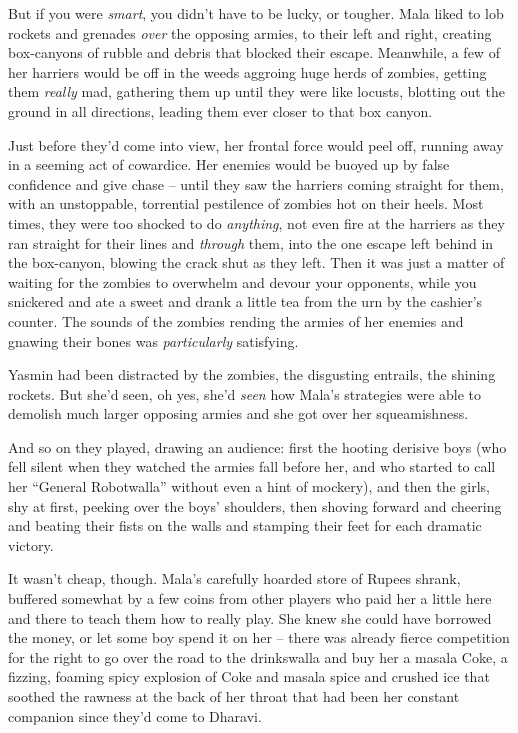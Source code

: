 But if you were \emph{smart}, you didn't have to be lucky, or
tougher. Mala liked to lob rockets and grenades \emph{over} the
opposing armies, to their left and right, creating box-canyons of
rubble and debris that blocked their escape. Meanwhile, a few of
her harriers would be off in the weeds aggroing huge herds of
zombies, getting them \emph{really} mad, gathering them up until
they were like locusts, blotting out the ground in all directions,
leading them ever closer to that box canyon.

Just before they'd come into view, her frontal force would peel
off, running away in a seeming act of cowardice. Her enemies would
be buoyed up by false confidence and give chase -- until they saw
the harriers coming straight for them, with an unstoppable,
torrential pestilence of zombies hot on their heels. Most times,
they were too shocked to do \emph{anything}, not even fire at the
harriers as they ran straight for their lines and \emph{through}
them, into the one escape left behind in the box-canyon, blowing
the crack shut as they left. Then it was just a matter of waiting
for the zombies to overwhelm and devour your opponents, while you
snickered and ate a sweet and drank a little tea from the urn by
the cashier's counter. The sounds of the zombies rending the armies
of her enemies and gnawing their bones was \emph{particularly}
satisfying.

Yasmin had been distracted by the zombies, the disgusting entrails,
the shining rockets. But she'd seen, oh yes, she'd \emph{seen} how
Mala's strategies were able to demolish much larger opposing armies
and she got over her squeamishness.

And so on they played, drawing an audience: first the hooting
derisive boys (who fell silent when they watched the armies fall
before her, and who started to call her ``General Robotwalla''
without even a hint of mockery), and then the girls, shy at first,
peeking over the boys' shoulders, then shoving forward and cheering
and beating their fists on the walls and stamping their feet for
each dramatic victory.

It wasn't cheap, though. Mala's carefully hoarded store of Rupees
shrank, buffered somewhat by a few coins from other players who
paid her a little here and there to teach them how to really play.
She knew she could have borrowed the money, or let some boy spend
it on her -- there was already fierce competition for the right to
go over the road to the drinkswalla and buy her a masala Coke, a
fizzing, foaming spicy explosion of Coke and masala spice and
crushed ice that soothed the rawness at the back of her throat that
had been her constant companion since they'd come to Dharavi.

